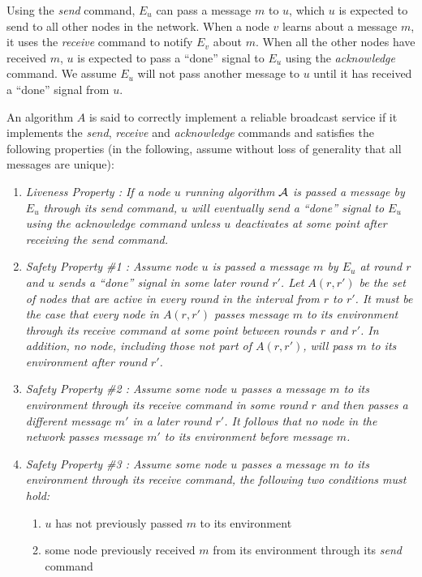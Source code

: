 \documentclass[english]{article}
\begin{document}
Using the \textit{send} command, $E_u$ can pass a message $m$ to $u$, which $u$ is expected to send to all other nodes in the network. When a node $v$ learns about a message $m$, it uses the \textit{receive} command to notify $E_v$ about $m$. When all the other nodes have received $m$, $u$ is expected to pass a ``done'' signal to $E_u$ using the \textit{acknowledge} command. We assume $E_u$ will not pass another message to $u$ until it has received a ``done'' signal from $u$. 

An algorithm $A$ is said to correctly implement a reliable broadcast service if it implements the \textit{send}, \textit{receive} and \textit{acknowledge} commands and satisfies the following properties (in the following, assume without loss of generality that all messages are unique):

\begin {enumerate}
 
  \item \em Liveness Property \em: If a node $u$ running algorithm $\cal A$ is passed a message by $E_u$ through its \textit{send} command, $u$ will eventually send  a ``done'' signal to $E_u$ using the \textit{acknowledge} command unless $u$ deactivates at some point after receiving the \textit{send} command.

  \item \em Safety Property \#1 \em: Assume node $u$ is passed a message $m$ by $E_u$ at round $r$ and $u$ sends  a ``done'' signal in some later round $r'$. Let $A(r,r')$ be the set of nodes that are active in every round in the interval from $r$ to $r'$. It must be the case that every node in $A(r,r')$ passes message $m$ to its environment through its \textit{receive} command at some point between rounds $r$ and $r'$. In addition, no node, including those not part of $A(r,r')$, will pass $m$ to its environment after round $r'$. 

  \item \em Safety Property \#2 \em: Assume some node $u$ passes a message $m$ to its environment through its \textit{receive} command in some round $r$ and then passes a different message $m'$ in a later round $r'$. It follows that no node in the network passes message $m'$ to its environment before message $m$. 

  \item \em Safety Property \#3 \em: Assume some node $u$ passes a message $m$ to its environment through its \textit{receive} command, the following two conditions must hold:
  \begin {enumerate}
    \item $u$ has not previously passed $m$ to its environment
    \item some node previously received $m$ from its environment through its \textit{send} command
  \end{enumerate}

\end{enumerate}
\end{document}
